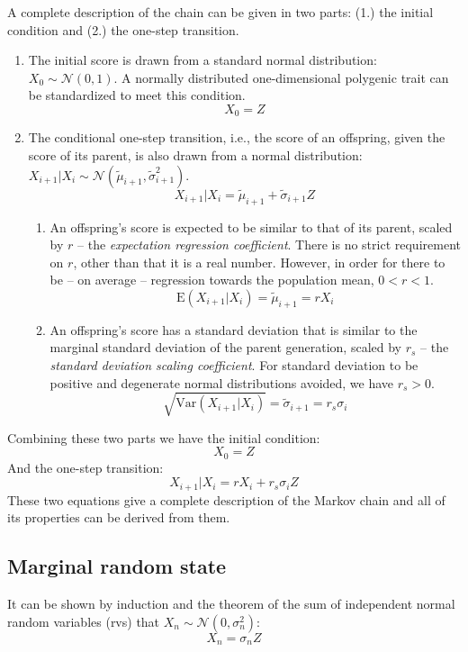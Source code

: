 \documentclass[a4paper,11pt]{article}
\begin{document}
A complete description of the chain can be given in two parts: (1.) the initial condition and (2.) the one-step transition. 

\begin{enumerate}
\item The initial score is drawn from a standard normal distribution: $X_0 \sim \mathcal{N}(0, 1)$. A normally distributed one-dimensional polygenic trait can be standardized to meet this condition.
$$X_0 = Z$$

\item The conditional one-step transition, i.e., the score of an offspring, given the score of its parent, is also drawn from a normal distribution: $X_{i+1}|X_i \sim \mathcal{N}(\tilde{\mu}_{i+1}, \tilde{\sigma}_{i+1}^2)$.
$$X_{i+1}|X_i = \tilde{\mu}_{i+1} + \tilde{\sigma}_{i+1} Z$$

\begin{enumerate}

\item An offspring's score is expected to be similar to that of its parent, scaled by $r$ -- the \emph{expectation regression coefficient}. There is no strict requirement on $r$, other than that it is a real number. However, in order for there to be -- on average -- regression towards the population mean, $0 < r < 1$.
$$\mathrm{E}(X_{i+1}|X_i) = \tilde{\mu}_{i+1} = rX_i$$

\item An offspring's score has a standard deviation that is similar to the marginal standard deviation of the parent generation, scaled by  $r_s$ -- the \emph{standard deviation scaling coefficient}. For standard deviation to be positive and degenerate normal distributions avoided, we have $r_s > 0$.
$$\sqrt{\mathrm{Var}(X_{i+1}|X_i)} =\tilde{\sigma}_{i+1} = r_s \sigma_i$$
\end{enumerate}
\end{enumerate}

Combining these two parts we have the initial condition:
$$X_0 = Z$$
And the one-step transition:
$$X_{i+1}|X_i = rX_i+ r_s\sigma_iZ$$
These two equations give a complete description of the Markov chain and all of its properties can be derived from them.

\subsection{Marginal random state}
It can be shown by induction and the theorem of the sum of independent normal random variables (rvs) that $X_n \sim \mathcal{N}(0, \sigma_n^2)$:
$$X_n = \sigma_nZ$$
\end{document}
